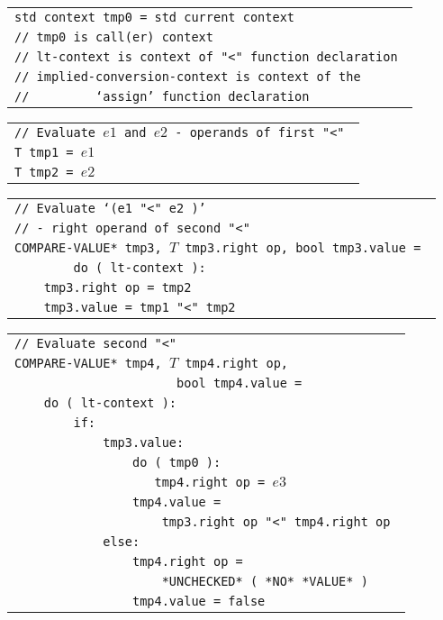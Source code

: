 \documentclass[12pt]{article}
\newenvironment{indpar}[1][0.3in]%
	{\begin{list}{}%
		     {\setlength{\itemsep}{0in}%
		      \setlength{\topsep}{0in}%
		      \setlength{\parsep}{1ex}%
		      \setlength{\labelwidth}{#1}%
		      \setlength{\leftmargin}{#1}%
		      \addtolength{\leftmargin}{\labelsep}}%
	 \item}%
	{\end{list}}
\begin{document}
\begin{indpar}
\begin{tabular}{l}
\tt std context tmp0 = std current context \\
\tt // tmp0 is call(er) context \\
\tt // lt-context is context of "<" function declaration \\
\tt // implied-conversion-context is context of the \\
\tt // ~~~~~~~~`assign' function declaration \\
\end{tabular}

\begin{tabular}{l}
\tt // Evaluate $e1$ and $e2$ - operands of first "<" \\
\tt T tmp1 = $e1$ \\
\tt T tmp2 = $e2$ \\
\end{tabular}

\begin{tabular}{l}
\tt // Evaluate `($e1$ "<" $e2$ )' \\
\tt // - right operand of second "<" \\
\tt *COMPARE-VALUE* tmp3, $T$ tmp3.right op, bool tmp3.value = \\
\tt ~~~~~~~~do ( lt-context ): \\
\tt ~~~~tmp3.right op = tmp2 \\
\tt ~~~~tmp3.value = tmp1 "<" tmp2 \\
\end{tabular}

\begin{tabular}{l}
\tt // Evaluate second "<" \\
\tt *COMPARE-VALUE* tmp4, $T$ tmp4.right op,\\
\tt ~~~~~~~~~~~~~~~~~~~~~~bool tmp4.value = \\
\tt ~~~~do ( lt-context ): \\
\tt ~~~~~~~~if: \\
\tt ~~~~~~~~~~~~tmp3.value: \\
\tt ~~~~~~~~~~~~~~~~do ( tmp0 ): \\
\tt ~~~~~~~~~~~~~~~~~~~tmp4.right op = $e3$ \\
\tt ~~~~~~~~~~~~~~~~tmp4.value = \\
\tt ~~~~~~~~~~~~~~~~~~~~tmp3.right op "<" tmp4.right op \\
\tt ~~~~~~~~~~~~else: \\
\tt ~~~~~~~~~~~~~~~~tmp4.right op = \\
\tt ~~~~~~~~~~~~~~~~~~~~*UNCHECKED* ( *NO* *VALUE* ) \\
\tt ~~~~~~~~~~~~~~~~tmp4.value = false \\
\end{tabular}


\end{indpar}
\end{document}
